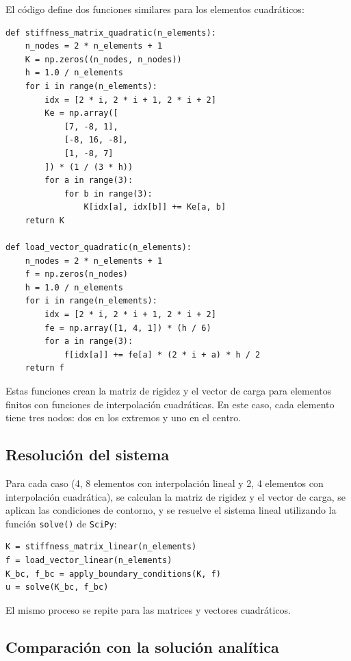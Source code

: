 El código define dos funciones similares para los elementos cuadráticos: 
\begin{verbatim}
def stiffness_matrix_quadratic(n_elements):
    n_nodes = 2 * n_elements + 1
    K = np.zeros((n_nodes, n_nodes))
    h = 1.0 / n_elements
    for i in range(n_elements):
        idx = [2 * i, 2 * i + 1, 2 * i + 2]
        Ke = np.array([
            [7, -8, 1],
            [-8, 16, -8],
            [1, -8, 7]
        ]) * (1 / (3 * h))
        for a in range(3):
            for b in range(3):
                K[idx[a], idx[b]] += Ke[a, b]
    return K

def load_vector_quadratic(n_elements):
    n_nodes = 2 * n_elements + 1
    f = np.zeros(n_nodes)
    h = 1.0 / n_elements
    for i in range(n_elements):
        idx = [2 * i, 2 * i + 1, 2 * i + 2]
        fe = np.array([1, 4, 1]) * (h / 6)
        for a in range(3):
            f[idx[a]] += fe[a] * (2 * i + a) * h / 2
    return f
\end{verbatim}

Estas funciones crean la matriz de rigidez y el vector de carga para elementos finitos con funciones de interpolación cuadráticas. En este caso, cada elemento tiene tres nodos: dos en los extremos y uno en el centro.

\subsection{Resolución del sistema}

Para cada caso (4, 8 elementos con interpolación lineal y 2, 4 elementos con interpolación cuadrática), se calculan la matriz de rigidez y el vector de carga, se aplican las condiciones de contorno, y se resuelve el sistema lineal utilizando la función \texttt{solve()} de \texttt{SciPy}:

\begin{verbatim}
K = stiffness_matrix_linear(n_elements)
f = load_vector_linear(n_elements)
K_bc, f_bc = apply_boundary_conditions(K, f)
u = solve(K_bc, f_bc)
\end{verbatim}

El mismo proceso se repite para las matrices y vectores cuadráticos.

\subsection{Comparación con la solución analítica}

